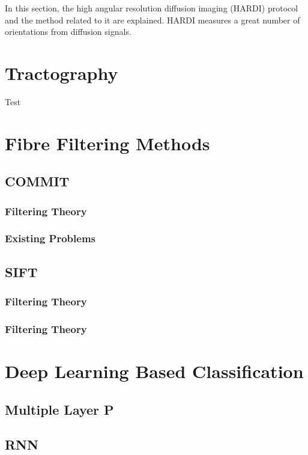 In this section, the high angular resolution diffusion imaging (HARDI) protocol and the method related to it are explained. 
HARDI measures a great number of orientations from diffusion signals.


\section{Tractography}

Test \autocite{dhollanderFixelbasedAnalysisDiffusion2021}


\section{Fibre Filtering Methods}

\subsection{COMMIT}

\subsubsection{Filtering Theory}

\subsubsection{Existing Problems}

\subsection{SIFT}

\subsubsection{Filtering Theory}

\subsubsection{Filtering Theory}

\section{Deep Learning Based Classification}

\subsection{Multiple Layer P}
\subsection{RNN}




